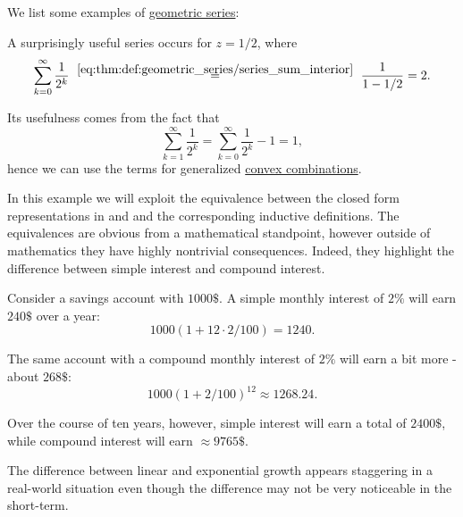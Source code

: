 \begin{example}\label{ex:def:geometric_series}
  We list some examples of \hyperref[def:geometric_series]{geometric series}:
  \begin{thmenum}
     A surprisingly useful series occurs for \( z = 1 / 2 \), where
    \begin{equation}\label{eq:ex:def:geometric_series/two}
      \sum_{k=0}^\infty \frac 1 {2^k}
      \reloset {\eqref{eq:thm:def:geometric_series/series_sum_interior}} =
      \frac 1 {1 - 1 / 2}
      =
      2.
    \end{equation}

    Its usefulness comes from the fact that
    \begin{equation}\label{eq:ex:def:geometric_series/two/one}
      \sum_{k=1}^\infty \frac 1 {2^k}
      =
      \sum_{k=0}^\infty \frac 1 {2^k} - 1
      =
      1,
    \end{equation}
    hence we can use the terms for generalized \hyperref[def:convex_hull]{convex combinations}.

     In this example we will exploit the equivalence between the closed form representations in  and  and the corresponding inductive definitions. The equivalences are obvious from a mathematical standpoint, however outside of mathematics they have highly nontrivial consequences. Indeed, they highlight the difference between simple interest and compound interest.

    Consider a savings account with \( 1000\$ \). A simple monthly interest of \( 2\% \) will earn \( 240\$ \) over a year:
    \begin{equation*}
      1000 (1 + 12 \cdot 2 / 100) = 1240.
    \end{equation*}

    The same account with a compound monthly interest of \( 2\% \) will earn a bit more - about \( 268\$ \):
    \begin{equation*}
      1000 (1 + 2 / 100)^{12} \approx 1268.24.
    \end{equation*}

    Over the course of ten years, however, simple interest will earn a total of \( 2400\$ \), while compound interest will earn \( \approx 9765\$ \).

    The difference between linear and exponential growth appears staggering in a real-world situation even though the difference may not be very noticeable in the short-term.
  \end{thmenum}
\end{example}
